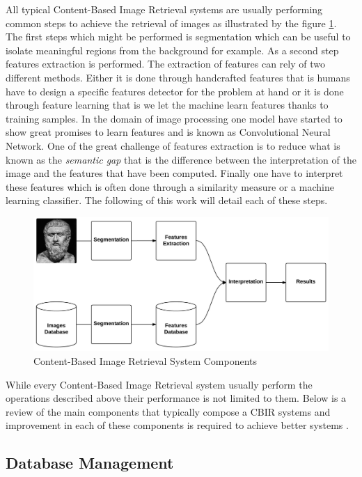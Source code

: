     All typical Content-Based Image Retrieval systems are usually performing common steps to achieve the retrieval of images as illustrated by the figure \ref{pipeline}. The first steps which might be performed is segmentation which can be useful to isolate meaningful regions from the background for example. As a second step features extraction is performed. The extraction of features can rely of two different methods. Either it is done through handcrafted features that is humans have to design a specific features detector for the problem at hand or it is done through feature learning that is we let the machine learn features thanks to training samples. In the domain of image processing one model have started to show great promises to learn features and is known as Convolutional Neural Network. One of the great challenge of features extraction is to reduce what is known as the \textit{semantic gap} that is the difference between the interpretation of the image and the features that have been computed. Finally one have to interpret these features which is often done through a similarity measure or a machine learning classifier. The following of this work will detail each of these steps.

    \begin{figure}[H]
      \centering
        \includegraphics[width=1\textwidth]{images/cbir_pipeline.jpeg}
      \caption{Content-Based Image Retrieval System Components}
      \label{pipeline}
    \end{figure}

    While every Content-Based Image Retrieval system usually perform the operations described above their performance is not limited to them. Below is a review of the main components that typically compose a CBIR systems and improvement in each of these components is required to achieve better systems \cite{gudivada1995content}.

    \subsection{Database Management}


